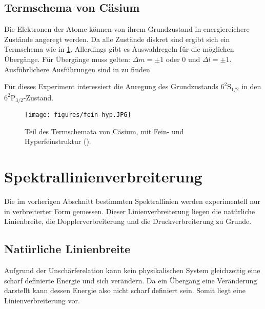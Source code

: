 \documentclass[../bericht.tex]{subfiles}
\begin{document}
      \subsection{Termschema von Cäsium}
      \label{subsec:termschema-caesium}

        Die Elektronen der Atome können von ihrem Grundzustand in energiereichere Zustände angeregt werden. Da alle Zustände diskret sind ergibt sich ein Termschema wie in \cref{fig:termschema}. Allerdings gibt es Auswahlregeln für die möglichen Übergänge. Für Übergänge muss gelten: $\Delta m= \pm 1$ oder 0 und $\Delta l=\pm 1$. Ausführlichere Ausführungen sind in \cite{grif:quanten} zu finden.

        Für dieses Experiment interessiert die Anregung des Grundzustands $6^2\mathrm{S}_{1/2}$ in den $6^2\mathrm{P}_{3/2}$-Zustand.
        \begin{figure}[tb]
          \begin{center}
            \fbox
            {
            \texttt{[image: figures/fein-hyp.JPG]}
            }
            \caption{Teil des Termschemata von Cäsium, mit Fein- und Hyperfeinstruktur (\cite{fein-hyp}). }
          \end{center}
          \label{fig:termschema}
        \end{figure}




    \section{Spektrallinienverbreiterung}
    \label{sec:linienverbreiterung}

      Die im vorherigen Abschnitt bestimmten Spektrallinien werden experimentell nur in verbreiterter Form gemessen. Dieser Linienverbreiterung liegen die natürliche Linienbreite, die Dopplerverbreiterung und die Druckverbreiterung zu Grunde.

      \subsection{Natürliche Linienbreite}
      \label{subsec:natuerliche-linienbreite}

        Aufgrund der Unschärferelation kann kein physikalischen System gleichzeitig eine scharf definierte Energie und sich verändern. Da ein Übergang eine Veränderung darstellt kann dessen Energie also nicht scharf definiert sein. Somit liegt eine Linienverbreiterung vor.
\end{document}
